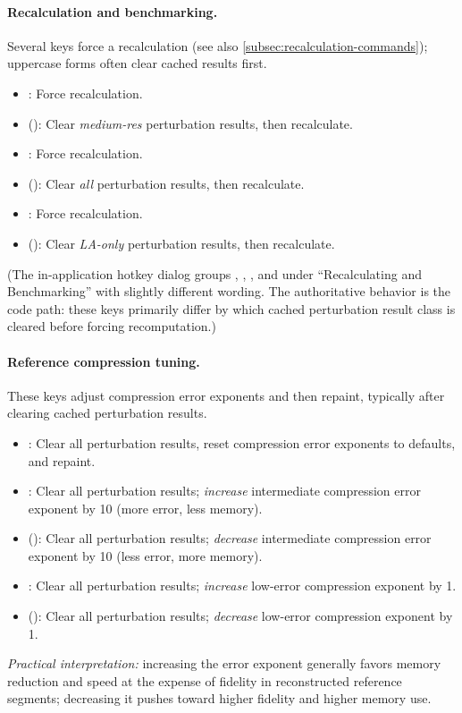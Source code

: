 \paragraph{Recalculation and benchmarking.}
Several keys force a recalculation (see also
\cref{subsec:recalculation-commands}); uppercase forms often clear cached
results first.
\begin{itemize}
  \item {}: Force recalculation.
  \item {} (): Clear \emph{medium-res} perturbation results, then recalculate.
  \item {}: Force recalculation.
  \item {} (): Clear \emph{all} perturbation results, then recalculate.
  \item {}: Force recalculation.
  \item {} (): Clear \emph{LA-only} perturbation results, then recalculate.
\end{itemize}
(The in-application hotkey dialog groups , ,
, and  under ``Recalculating and Benchmarking'' with
slightly different wording.  The authoritative behavior is the code path: these
keys primarily differ by which cached perturbation result class is cleared
before forcing recomputation.)

\paragraph{Reference compression tuning.}
These keys adjust compression error exponents and then repaint, typically after
clearing cached perturbation results.
\begin{itemize}
  \item {}: Clear all perturbation results, reset compression error exponents to defaults,
        and repaint.
  \item {}: Clear all perturbation results; \emph{increase} intermediate compression error
        exponent by 10 (more error, less memory).
  \item {} (): Clear all perturbation results; \emph{decrease} intermediate compression
        error exponent by 10 (less error, more memory).
  \item {}: Clear all perturbation results; \emph{increase} low-error compression exponent by 1.
  \item {} (): Clear all perturbation results; \emph{decrease} low-error compression exponent by 1.
\end{itemize}
\emph{Practical interpretation:} increasing the error exponent generally favors
memory reduction and speed at the expense of fidelity in reconstructed reference
segments; decreasing it pushes toward higher fidelity and higher memory use.

